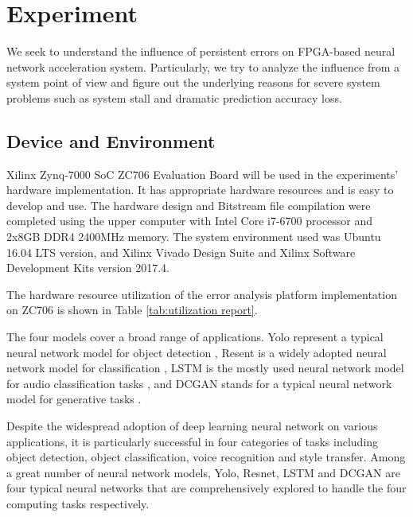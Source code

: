 \section{Experiment} \label{sec:experiment}
We seek to understand the influence of persistent errors on 
FPGA-based neural network acceleration system. Particularly, 
we try to analyze the influence from a system point of view
and figure out the underlying reasons for severe system problems 
such as system stall and dramatic prediction accuracy loss. 

\subsection{Device and Environment}
Xilinx Zynq-7000 SoC ZC706 Evaluation Board will be used in 
the experiments’ hardware implementation. It has 
appropriate hardware resources and is easy to develop and 
use. The hardware design and Bitstream file compilation 
were completed using the upper computer with Intel Core 
i7-6700 processor and 2x8GB DDR4 2400MHz memory. The system 
environment used was Ubuntu 16.04 LTS version, and Xilinx 
Vivado Design Suite and Xilinx Software Development Kits 
version 2017.4.

The hardware resource utilization of the error analysis 
platform implementation on ZC706 is shown in Table \ref{tab:utilization report}.

The four models cover a broad range of applications.
Yolo represent a typical neural network model for object detection \cite{redmon2016yolo9000}, 
Resent is a widely adopted neural network model for classification \cite{He_2016_CVPR}, 
LSTM is the mostly used neural network model for audio classification 
tasks \cite{sak2014long}, and DCGAN stands for a typical neural network model for 
generative tasks \cite{radford2015unsupervised}. 

Despite the widespread adoption of deep learning 
neural network on various applications, it is particularly 
successful in four categories of tasks including object detection, 
object classification, voice recognition and style transfer.
Among a great number of neural network models,
Yolo, Resnet, LSTM and DCGAN are four typical neural networks 
that are comprehensively explored to handle the four computing 
tasks respectively. 

